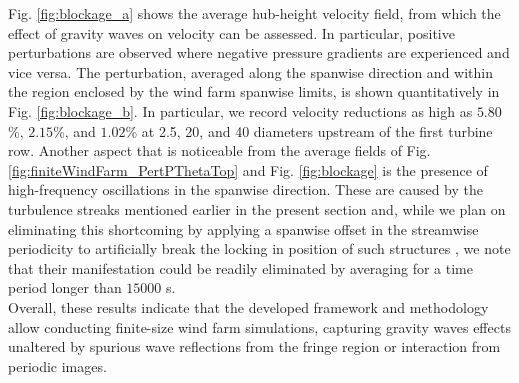 \documentclass[journal abbreviation, manuscript]{copernicus}
\begin{document}
Fig. \ref{fig:blockage_a} shows the average hub-height velocity field, from which the effect of gravity waves on velocity can be assessed. In particular, positive perturbations are observed where negative pressure gradients are experienced and vice versa. The perturbation, averaged along the spanwise direction and within the region enclosed by the wind farm spanwise limits, is shown quantitatively in Fig. \ref{fig:blockage_b}. In particular, we record velocity reductions as high as $5.80$\%, $2.15$\%, and $1.02$\% at 2.5, 20, and 40 diameters upstream of the first turbine row. Another aspect that is noticeable from the average fields of Fig. \ref{fig:finiteWindFarm_PertPThetaTop} and Fig. \ref{fig:blockage} is the presence of high-frequency oscillations in the spanwise direction. These are caused by the turbulence streaks mentioned earlier in the present section and, while we plan on eliminating this shortcoming by applying a spanwise offset in the streamwise periodicity to artificially break the locking in position of such structures \citep{2016_MuntersEtAl}, we note that their manifestation could be readily eliminated by averaging for a time period longer than $15000$ s.\\%

Overall, these results indicate that the developed framework and methodology allow conducting finite-size wind farm simulations, capturing gravity waves effects unaltered by spurious wave reflections from the fringe region or interaction from periodic images. 
\end{document}
